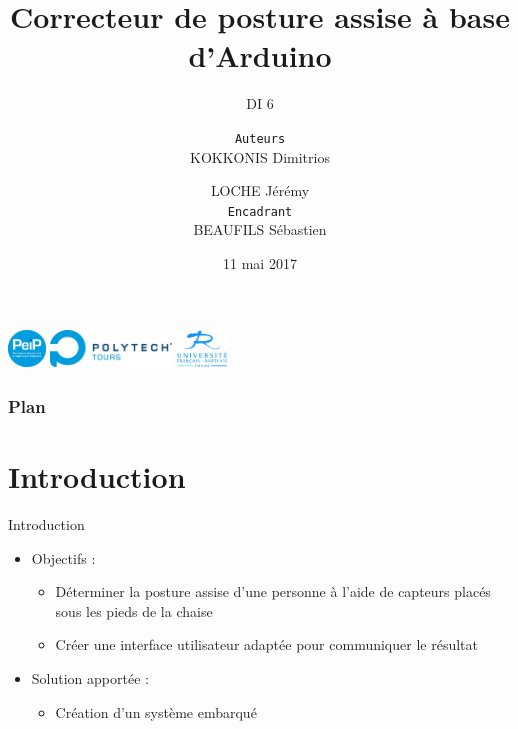 \documentclass{beamer}
\title{Correcteur de posture assise à base d'Arduino}
\subtitle{\small DI 6}
\author[KOKKONIS Dimitrios \\\and LOCHE Jérémy]{\small {\small \texttt{Auteurs}}\\ KOKKONIS Dimitrios \\\and LOCHE Jérémy\\
\vspace{5px}
{\small \texttt{Encadrant}}\\ BEAUFILS Sébastien}
\institute{\textsc{École Polytechnique de l'Université de Tours}}
\date{11 mai 2017}
\begin{document}
\begin{frame}
\vspace{0.1cm}
\includegraphics[height=1cm]{images/Logo_PeiP_v2009_RGB_3cm_300dpi.jpg}
\includegraphics[height=1cm]{images/logo_Polytech_Tours_RVB_3cm_300dpi.jpg}
\hfill
\includegraphics[height=1cm]{images/logo_UFR_4cm_300dpi.jpg}
\titlepage
\end{frame}

\begin{frame}
\frametitle{Plan}
\tableofcontents
\end{frame}

\section*{Introduction}
\begin{frame}
\begin{block}{Introduction}
\begin{itemize}
\item Objectifs :
\begin{itemize}
\item Déterminer la posture assise d'une personne à l'aide de capteurs placés sous les pieds de la chaise
\item Créer une interface utilisateur adaptée pour communiquer le résultat
\end{itemize}
\item Solution apportée :
\begin{itemize}
\item Création d'un système embarqué 
\end{itemize}
\end{itemize}
\end{block}
\end{frame}
\end{document}
